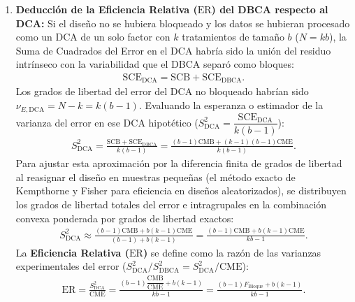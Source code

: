 \begin{solproblema}
\begin{enumerate}
		\item \textbf{Deducción de la Eficiencia Relativa ($\text{ER}$) del DBCA respecto al DCA:}
		Si el diseño no se hubiera bloqueado y los datos se hubieran procesado como un DCA de un solo factor con $k$ tratamientos de tamaño $b$ ($N=kb$), la Suma de Cuadrados del Error en el DCA habría sido la unión del residuo intrínseco con la variabilidad que el DBCA separó como bloques:
		\begin{align}
			\text{SCE}_{\text{DCA}} = \text{SCB} + \text{SCE}_{\text{DBCA}}.
		\end{align}
		Los grados de libertad del error del DCA no bloqueado habrían sido $\nu_{E,\text{DCA}} = N - k = k(b - 1)$.
		Evaluando la esperanza o estimador de la varianza del error en ese DCA hipotético ($S_{\text{DCA}}^2 = \dfrac{\text{SCE}_{\text{DCA}}}{k(b-1)}$):
		\begin{align}
			S_{\text{DCA}}^2 = \frac{\text{SCB} + \text{SCE}_{\text{DBCA}}}{k(b - 1)} = \frac{(b-1)\text{CMB} + (k-1)(b-1)\text{CME}}{k(b-1)}.
		\end{align}
		Para ajustar esta aproximación por la diferencia finita de grados de libertad al reasignar el diseño en muestras pequeñas (el método exacto de Kempthorne y Fisher para eficiencia en diseños aleatorizados), se distribuyen los grados de libertad totales del error e intragrupales en la combinación convexa ponderada por grados de libertad exactos:
		\begin{align}
			S_{\text{DCA}}^2 \approx \frac{(b-1)\text{CMB} + b(k-1)\text{CME}}{(b-1) + b(k-1)} = \frac{(b-1)\text{CMB} + b(k-1)\text{CME}}{kb - 1}.
		\end{align}
		La \textbf{Eficiencia Relativa ($\text{ER}$)} se define como la razón de las varianzas experimentales del error ($S_{\text{DCA}}^2 / S_{\text{DBCA}}^2 = S_{\text{DCA}}^2 / \text{CME}$):
		\begin{align}
			\text{ER} = \frac{S_{\text{DCA}}^2}{\text{CME}} = \frac{(b-1)\dfrac{\text{CMB}}{\text{CME}} + b(k-1)}{kb - 1} = \frac{(b-1)F_{\text{Bloque}} + b(k-1)}{kb - 1}.
		\end{align}
		

\end{enumerate}
\end{solproblema}
